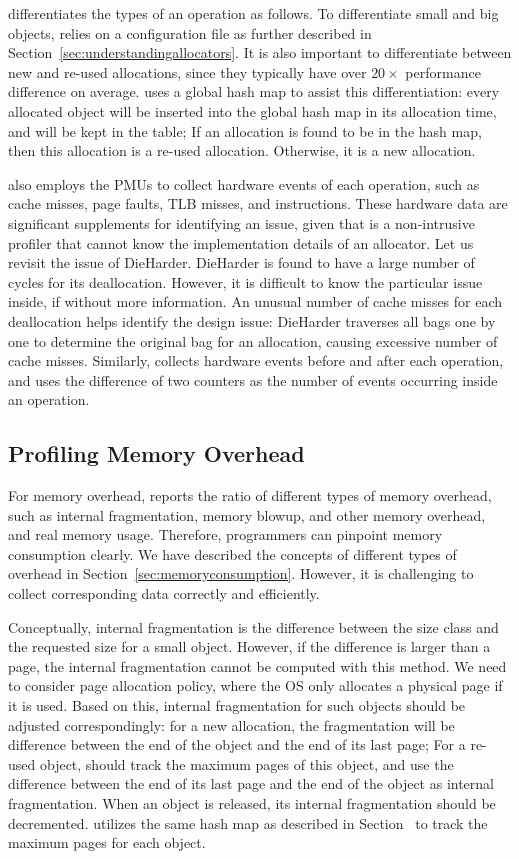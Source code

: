 \MP{} differentiates the types of an operation as follows. To differentiate small and big objects, \MP{} relies on a configuration file as further described in Section~\ref{sec:understandingallocators}. It is also important to differentiate between new and re-used allocations, since they typically have over $20\times$ performance difference on average. \MP{} uses a global hash map to assist this differentiation: every allocated object will be inserted into the global hash map in its allocation time, and will be kept in the table; If an allocation is found to be in the hash map, then this allocation is a re-used allocation. Otherwise, it is a new allocation.  


\MP{} also employs the PMUs to collect hardware events of each operation, such as cache misses, page faults, TLB misses, and instructions. These hardware data are  significant supplements for identifying an issue, given that \MP{} is a non-intrusive profiler that cannot know the implementation details of an allocator. Let us revisit the issue of DieHarder. DieHarder is found to have a large number of cycles for its deallocation. However, it is difficult to know the particular issue inside, if without more information. An unusual number of cache misses for each deallocation helps identify the design issue: DieHarder traverses all bags one by one to determine the original bag for an allocation, causing excessive number of cache misses. Similarly, \MP{} collects hardware events before and after each operation, and uses the difference of two counters as the number of events occurring inside an operation. 

\subsection{Profiling Memory Overhead}
\label{sec:profilingmemory}

For memory overhead, \MP{} reports the ratio of different types of memory overhead, such as internal fragmentation, memory blowup, and other memory overhead, and real memory usage. Therefore, programmers can pinpoint memory consumption clearly. We have described the concepts of different types of overhead in Section~\ref{sec:memoryconsumption}. However, it is challenging to collect corresponding data correctly and efficiently.


Conceptually, internal fragmentation is the difference between the size class and the requested size for a small object. However, if the difference is larger than a page, the internal fragmentation cannot be computed  with this method. We need to consider page allocation policy, where the OS only allocates a physical page if it is used. Based on this, internal fragmentation for such objects should be adjusted correspondingly: for a new allocation, the fragmentation will be difference between the end of the object and the end of its last page; For a re-used object, \MP{} should track the maximum pages of this object, and use the difference between the end of its last page and the end of the object as internal fragmentation. When an object is released, its internal fragmentation should be decremented. \MP{} utilizes the same hash map as described in Section~\cite{sec:performanceimplement} to track the maximum pages for each object. 

